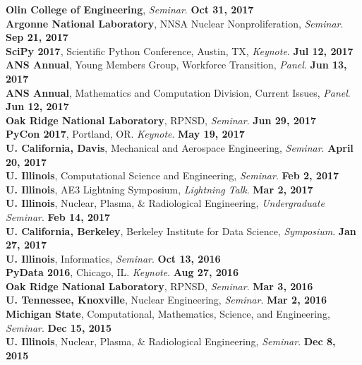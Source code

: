 \documentclass[margin,line]{resume}
\begin{document}
\begin{resume}
      \textbf{Olin College of Engineering}, \emph{Seminar}.  \hfill\textbf{Oct 31, 2017}\\
      \textbf{Argonne National Laboratory}, NNSA Nuclear Nonproliferation, \emph{Seminar}.  \hfill\textbf{Sep 21, 2017}\\
      \textbf{SciPy 2017}, Scientific Python Conference, Austin, TX, \emph{Keynote}.  \hfill\textbf{Jul 12, 2017}\\
      \textbf{ANS Annual}, Young Members Group, Workforce Transition, \emph{Panel}.  \hfill\textbf{Jun 13, 2017}\\
      \textbf{ANS Annual}, Mathematics and Computation Division, Current Issues, \emph{Panel}.  \hfill\textbf{Jun 12, 2017}\\
      \textbf{Oak Ridge National Laboratory}, RPNSD, \emph{Seminar}.  \hfill\textbf{Jun 29, 2017}\\
      \textbf{PyCon 2017}, Portland, OR. \emph{Keynote}.  \hfill\textbf{May 19, 2017}\\
      \textbf{U. California, Davis}, Mechanical and Aerospace Engineering, \emph{Seminar}.  \hfill\textbf{April 20, 2017}\\
      \textbf{U. Illinois}, Computational Science and Engineering, \emph{Seminar}.  \hfill\textbf{Feb 2, 2017}\\
      \textbf{U. Illinois}, AE3 Lightning Symposium, \emph{Lightning Talk}.  \hfill\textbf{Mar 2, 2017}\\
      \textbf{U. Illinois}, Nuclear, Plasma, \& Radiological Engineering, \emph{Undergraduate Seminar}.  \hfill\textbf{Feb 14, 2017}\\
      \textbf{U. California, Berkeley}, Berkeley Institute for Data Science, \emph{Symposium}.  \hfill\textbf{Jan 27, 2017}\\
      \textbf{U. Illinois}, Informatics, \emph{Seminar}.  \hfill\textbf{Oct 13, 2016}\\
      \textbf{PyData 2016}, Chicago, IL. \emph{Keynote}.  \hfill\textbf{Aug 27, 2016}\\
      \textbf{Oak Ridge National Laboratory}, RPNSD, \emph{Seminar}.  \hfill\textbf{Mar 3, 2016}\\
      \textbf{U. Tennessee, Knoxville}, Nuclear Engineering, \emph{Seminar}.  \hfill\textbf{Mar 2, 2016}\\
      \textbf{Michigan State}, Computational, Mathematics, Science, and Engineering, \emph{Seminar}.  \hfill\textbf{Dec 15, 2015}\\
      \textbf{U. Illinois}, Nuclear, Plasma, \& Radiological Engineering, \emph{Seminar}.          \hfill\textbf{Dec 8, 2015}\\

\end{resume}
\end{document}
